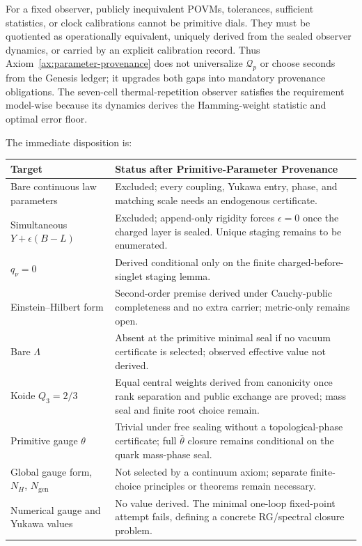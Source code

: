 \begin{proposition}
For a fixed observer, publicly inequivalent POVMs, tolerances, sufficient statistics,
or clock calibrations cannot be primitive dials.  They must be quotiented as
operationally equivalent, uniquely derived from the sealed observer dynamics, or
carried by an explicit calibration record.  Thus
Axiom~\ref{ax:parameter-provenance} does not universalize \(\mathcal Q_p\) or choose
seconds from the Genesis ledger; it upgrades both gaps into mandatory provenance
obligations.  The seven-cell thermal-repetition observer satisfies the requirement
model-wise because its dynamics derives the Hamming-weight statistic and optimal
error floor.
\end{proposition}

\begin{remark}
The immediate disposition is:
\begin{center}
\small
\begin{tabularx}{\textwidth}{l Y}
\toprule
Target & Status after Primitive-Parameter Provenance \\
\midrule
Bare continuous law parameters
& Excluded; every coupling, Yukawa entry, phase, and matching scale needs an endogenous certificate. \\
Simultaneous \(Y+\epsilon(B-L)\)
& Excluded; append-only rigidity forces \(\epsilon=0\) once the charged layer is sealed.  Unique staging remains to be enumerated. \\
\(q_\nu=0\)
& Derived conditional only on the finite charged-before-singlet staging lemma. \\
Einstein--Hilbert form
& Second-order premise derived under Cauchy-public completeness and no extra carrier; metric-only remains open. \\
Bare \(\Lambda\)
& Absent at the primitive minimal seal if no vacuum certificate is selected; observed effective value not derived. \\
Koide \(Q_3=2/3\)
& Equal central weights derived from canonicity once rank separation and public exchange are proved; mass seal and finite root choice remain. \\
Primitive gauge \(\theta\)
& Trivial under free sealing without a topological-phase certificate; full \(\bar\theta\) closure remains conditional on the quark mass-phase seal. \\
Global gauge form, \(N_H\), \(N_{\mathrm{gen}}\)
& Not selected by a continuum axiom; separate finite-choice principles or theorems remain necessary. \\
Numerical gauge and Yukawa values
& No value derived.  The minimal one-loop fixed-point attempt fails, defining a concrete RG/spectral closure problem. \\
\bottomrule
\end{tabularx}
\end{center}
\end{remark}
